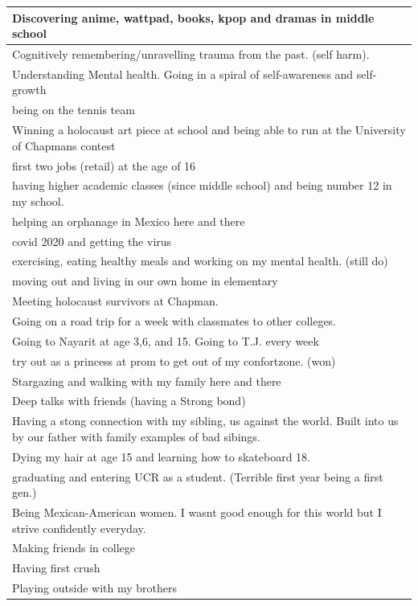 \documentclass[
  .7em,
  letterpaper,
  DIV=11,
  numbers=noendperiod]{scrartcl}
\begin{document}
\begin{table}
\begin{tabular}{l}
\hline
Discovering anime, wattpad, books, kpop and dramas in middle school\\
\hline
Cognitively remembering/unravelling trauma from the past. (self harm).\\
\hline
Understanding Mental health. Going in a spiral of self-awareness and self-growth\\
\hline
being on the tennis team\\
\hline
Winning a holocaust art piece at school and being able to run at the University of Chapmans contest\\
\hline
first two jobs (retail) at the age of 16\\
\hline
having higher academic classes (since middle school) and being number 12 in my school.\\
\hline
helping an orphanage in Mexico here and there\\
\hline
covid 2020 and getting the virus\\
\hline
exercising, eating healthy meals and working on my mental health. (still do)\\
\hline
moving out and living in our own home in elementary\\
\hline
Meeting holocaust survivors at Chapman.\\
\hline
Going on a road trip for a week with classmates to other colleges.\\
\hline
Going to Nayarit at age 3,6, and 15. Going to T.J. every week\\
\hline
try out as a princess at prom to get out of my confortzone. (won)\\
\hline
Stargazing and walking with my family here and there\\
\hline
Deep talks with friends (having a Strong bond)\\
\hline
Having a stong connection with my sibling, us against the world. Built into us by our father with family examples of bad sibings.\\
\hline
Dying my hair at age 15 and learning how to skateboard 18.\\
\hline
graduating and entering UCR as a student. (Terrible first year being a first gen.)\\
\hline
Being Mexican-American women. I wasnt good enough for this world but I strive confidently everyday.\\
\hline
Making friends in college\\
\hline
Having first crush\\
\hline
Playing outside with my brothers\\

\end{tabular}
\end{table}
\end{document}
